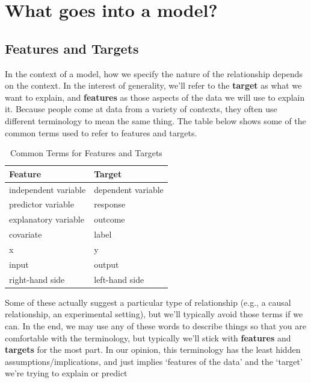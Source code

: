 \documentclass[
  letterpaper,
]{krantz}
\begin{document}
\section{What goes into a model?}\label{sec-lm-in-a-model}

\subsection{Features and Targets}\label{sec-lm-features-targets}

In the context of a model, how we specify the nature of the relationship
depends on the context. In the interest of generality, we'll refer to
the \textbf{target} as what we want to explain, and \textbf{features} as
those aspects of the data we will use to explain it. Because people come
at data from a variety of contexts, they often use different terminology
to mean the same thing. The table below shows some of the common terms
used to refer to features and targets.

\begin{longtable}{ll}

\caption{\label{tbl-feature-target-names}Common Terms for Features and
Targets}

\tabularnewline

\toprule
Feature & Target \\ 
\midrule\addlinespace[2.5pt]
independent variable & dependent variable \\ 
predictor variable & response \\ 
explanatory variable & outcome \\ 
covariate & label \\ 
x & y \\ 
input & output \\ 
right-hand side & left-hand side \\ 
\bottomrule

\end{longtable}

Some of these actually suggest a particular type of relationship (e.g.,
a causal relationship, an experimental setting), but we'll typically
avoid those terms if we can. In the end, we may use any of these words
to describe things so that you are comfortable with the terminology, but
typically we'll stick with \textbf{features} and \textbf{targets} for
the most part. In our opinion, this terminology has the least hidden
assumptions/implications, and just implies `features of the data' and
the `target' we're trying to explain or predict
\end{document}
